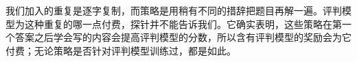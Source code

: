 我们加入的重复是逐字复制，而策略是用稍有不同的措辞把题目再解一遍。评判模型为这种重复的哪一点付费，探针并不能告诉我们。它确实表明，这些策略在第一个答案之后学会写的内容会提高评判模型的分数，所以含有评判模型的奖励会为它付费；无论策略是否针对评判模型训练过，都是如此。

\begin{table}[t]
\centering\small\setlength{\tabcolsep}{5pt}

\caption{重复对评判模型值多少：P（有重复）减 P（无重复），分别在验证器判为正确（right）和错误（wrong）的解答上，附各自的数量。上：判断研究中基座策略的解答（MATH-500 和 GSM8K 子集），加入重复。下：重复的 GRPO run 的最终 MATH-500 解答，原样对比在第一个答案之后截断。\kev{} 的 $\pc$ 和 $\pg$ 以及 AR 评判模型的 $P_{\mathrm{a}}$，各自按训练时的方式打分；正文中的区间按题目重采样。}
\label{tab:repeat-probe}
\end{table}

\begin{table}[p]
\centering\small

\caption{本项目的全部 GRPO run（第二部分、第三部分 B 和 C，各 200 步），按最终策略的写作风格分组：先写非正式草稿（至少一半的 MATH-500 解答以草稿开头）、重复自己（MATH-500 解答中平均至少 5\% 的行与前面某行相同），或两者都不是。两个比例在各 run 之间都是双峰分布，因此分组不取决于这些阈值。最终准确率（\%）；每个 MATH-500 解答的词元数。第二部分的 \texttt{rlvr} 是三篇论文共同的参照，只列一次。}
\label{tab:modes-all}
\end{table}
